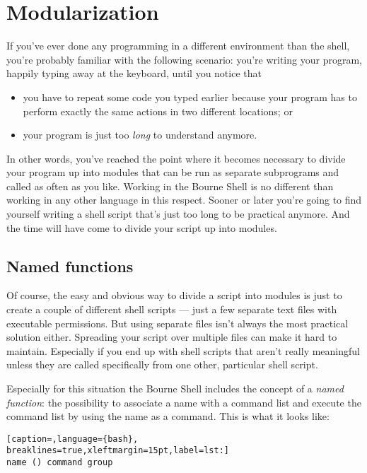\section{Modularization}
If you've ever done any programming in a different environment than the shell,
you're probably familiar with the following scenario: you're writing your
program, happily typing away at the keyboard, until you notice that

\begin{itemize}
	\item you have to repeat some code you typed earlier because your program
has to perform exactly the same actions in two different locations; or
	\item your program is just too \emph{long} to understand anymore.
\end{itemize}

In other words, you've reached the point where it becomes necessary to divide
your program up into modules that can be run as separate subprograms and called
as often as you like. Working in the Bourne Shell is no different than working
in any other language in this respect. Sooner or later you're going to find
yourself writing a shell script that's just too long to be practical anymore.
And the time will have come to divide your script up into modules.

\subsection{Named functions}
Of course, the easy and obvious way to divide a script into modules is just to
create a couple of different shell scripts --- just a few separate text files
with executable permissions. But using separate files isn't always the most
practical solution either. Spreading your script over multiple files can make
it hard to maintain. Especially if you end up with shell scripts that aren't
really meaningful unless they are called specifically from one other,
particular shell script.

Especially for this situation the Bourne Shell includes the concept of a
\emph{named function}: the possibility to associate a name with a command list
and execute the command list by using the name as a command. This is what it
looks like:
\lstset{basicstyle=\scriptsize, numbers=left, captionpos=b, tabsize=4}
\begin{lstlisting}[caption=,language={bash},
breaklines=true,xleftmargin=15pt,label=lst:]
name () command group
\end{lstlisting}

